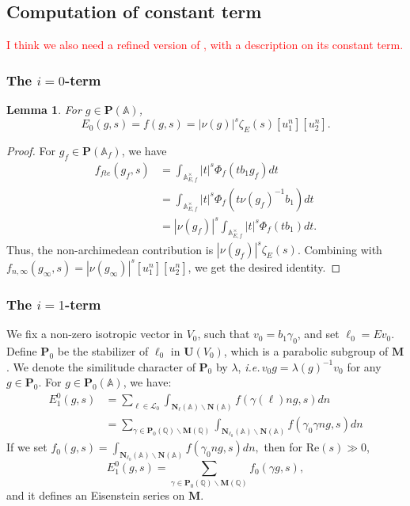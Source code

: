 \documentclass[12pt]{article}
\newtheorem{lemma}[thm]{Lemma}
\newtheorem{prop}[thm]{Proposition}
\theoremstyle{remark}
\theoremstyle{definition}
\newcommand{\Q}{\mathbb{Q}}
\newcommand{\A}{\mathbb{A}}
\newcommand{\rmm}[1]{\mathrm{#1}}
\newcommand{\bff}[1]{\mathbf{#1}}
\newcommand{\call}[1]{\mathcal{#1}}
\begin{document}
\subsection{Computation of constant term}
\label{section constant term of Eisenstein series}
\textcolor{red}{I think we also need a refined version of \cite[Corollary 1.2]{Hilado_McGlade_Yan_Fourier_coefficients_unitary_group},
with a description on its constant term.}
\subsubsection{The \texorpdfstring{$i=0$}{PDFstring}-term}
\label{section i=0 part constant term}
\begin{lemma}
    For $g\in \bff{P}(\A)$,
    \[E_{0}(g,s)=f(g,s)=|\nu(g)|^{s}\zeta_{E}(s)[u_{1}^{n}][u_{2}^{n}].\]
\end{lemma}
\begin{proof}
    For $g_{f}\in \bff{P}(\A_{f})$,
    we have 
    \begin{align*}
        f_{fte}(g_f,s)&=\int_{\A_{E,f}^{\times}}|t|^{s}\Phi_{f}(tb_{1}g_{f})dt\\
        &=\int_{\A_{E,f}^{\times}}|t|^{s}\Phi_{f}(t\nu(g_{f})^{-1}b_{1})dt\\
        &=|\nu(g_{f})|^{s}\int_{\A_{E,f}^{\times}}|t|^{s}\Phi_{f}(tb_{1})dt.
    \end{align*}
    Thus, the non-archimedean contribution is $|\nu(g_{f})|^{s}\zeta_{E}(s)$.
    Combining with $f_{n,\infty}(g_{\infty},s)=|\nu(g_{\infty})|^{s}[u_{1}^{n}][u_{2}^{n}]$,
    we get the desired identity.
\end{proof}
\subsubsection{The \texorpdfstring{$i=1$}{PDFstring}-term}
\label{section i=1 part constant term}
We fix a non-zero isotropic vector in $V_{0}$,
such that $v_{0}=b_{1}\gamma_{0}$,
and set $\ell_{0}=Ev_{0}$.
Define $\bff{P}_{0}$ be the stabilizer of $\ell_{0}$ in $\bff{U}(V_{0})$,
which is a parabolic subgroup of $\bff{M}$.
We denote the similitude character of $\bff{P}_{0}$ by $\lambda$,
\emph{i.e.\,}$v_{0}g=\lambda(g)^{-1}v_{0}$ for any $g\in\bff{P}_{0}$.
For $g\in\bff{P}_{0}(\A)$,
we have:
\begin{align*}
    E_{1}^{0}(g,s)&=\sum_{\ell\in \call{L}_{0}}\int_{\bff{N}_{\ell}(\A)\backslash \bff{N}(\A)}f(\gamma(\ell)ng,s)dn \\
    &=\sum_{\gamma\in \bff{P}_{0}(\Q)\backslash\bff{M}(\Q)}\int_{\bff{N}_{\ell_{0}}(\A)\backslash \bff{N}(\A)}f(\gamma_{0}\gamma ng,s)dn
\end{align*}
If we set $f_{0}(g,s)=\int_{\bff{N}_{\ell_{0}}(\A)\backslash \bff{N}(\A)}f(\gamma_{0}ng,s)dn,$
then for $\rmm{Re}(s)\gg 0$,
\[E_{1}^{0}(g,s)=\sum_{\gamma\in\bff{P}_{0}(\Q)\backslash \bff{M}(\Q)}f_{0}(\gamma g,s),\]
and it defines an Eisenstein series on $\bff{M}$.
   
\end{document}
